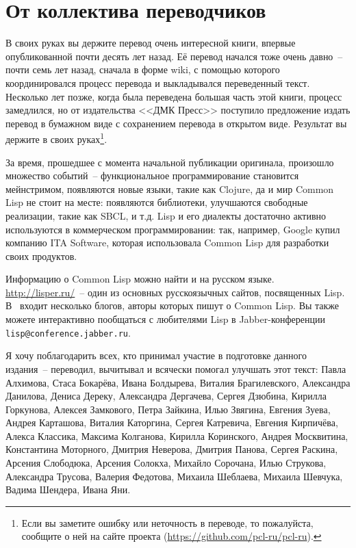 \chapter*{От коллектива переводчиков}

В своих руках вы держите перевод очень интересной книги, впервые опубликованной почти
десять лет назад.  Её перевод начался тоже очень давно~-- почти семь лет назад, сначала в
форме wiki, с помощью которого координировался процесс перевода и выкладывался переведенный
текст.  Несколько лет позже, когда была переведена большая часть этой книги, процесс
замедлился, но от издательства <<ДМК Пресс>> поступило предложение издать перевод в
бумажном виде с сохранением перевода в открытом виде.  Результат вы держите в своих
руках\footnote{Если вы заметите ошибку или неточность в переводе, то пожалуйста, сообщите
  о ней на сайте проекта (\url{https://github.com/pcl-ru/pcl-ru}).}\hspace{\footnotenegspace}.

За время, прошедшее с момента начальной публикации оригинала, произошло множество событий~--
функциональное программирование становится мейнстримом, появляются новые языки, такие как
Clojure, да
и мир Common Lisp не стоит на месте: появляются библиотеки, улучшаются свободные
реализации, такие как SBCL, и т.д.  Lisp и его диалекты достаточно активно используются в
коммерческом программировании: так, например, Google купил компанию ITA Software, которая
использовала Common Lisp для разработки своих продуктов.

Информацию о Common Lisp можно найти и на русском языке.
\mbox{\url{http://lisper.ru/}}~-- один из основных русскоязычных сайтов, посвященных Lisp.
В~
входит несколько блогов, авторы которых пишут о Common Lisp.  Вы также можете интерактивно
пообщаться с любителями Lisp в Jabber-конференции \verb|lisp@conference.jabber.ru|.

Я хочу поблагодарить всех, кто принимал участие в подготовке данного издания~-- переводил,
вычитывал и всячески помогал улучшать этот текст: Павла Алхимова, Стаса Бокарёва, Ивана
Болдырева, Виталия Брагилевского, Александра Данилова, Дениса Дереку, Александра
Дергачева, Сергея Дзюбина, Кирилла Горкунова, Алексея Замкового, Петра Зайкина, Илью
Звягина, Евгения Зуева, Андрея Карташова, Виталия Каторгина, Сергея Катревича, Евгения
Кирпичёва, Алекса Классика, Максима Колганова, Кирилла Коринского, Андрея Москвитина,
Константина Моторного, Дмитрия Неверова, Дмитрия Панова, Сергея Раскина, Арсения
Слободюка, Арсения Солокха, Михайло Сорочана, Илью Струкова, Александра Трусова, Валерия
Федотова, Михаила Шеблаева, Михаила Шевчука, Вадима Шендера, Ивана Яни.

